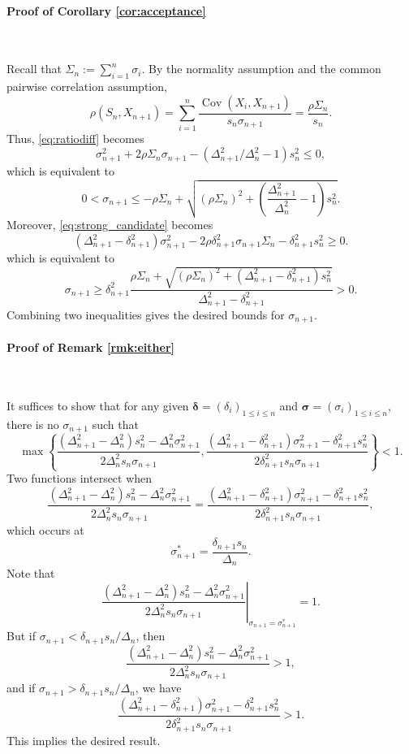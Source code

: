 \documentclass[fleqn,mnsc,nonblindrev]{informs4}
\newcommand{\Cov}{\operatorname{Cov}}
\begin{document}
\paragraph{Proof of Corollary \ref{cor:acceptance}}
\

Recall that $\Sigma_{n}:=\sum_{i=1}^n\sigma_{i}.$ By the normality assumption and the common pairwise correlation assumption,
\[
\rho(S_n,X_{n+1})=\sum_{i=1}^{n}\frac{\Cov(X_i,X_{n+1})}{s_{n}\sigma_{n+1}}=\frac{\rho\Sigma_{n}}{s_{n}}.
\]
Thus, \eqref{eq:ratiodiff} becomes
\[\sigma_{n+1}^2+2\rho\Sigma_{n}\sigma_{n+1}-(\Delta_{n+1}^2/\Delta_{n}^2-1)s_{n}^2\leq 0,
\]
which is equivalent to
\[
0<\sigma_{n+1}\leq  -\rho\Sigma_{n}+\sqrt{\left(\rho\Sigma_{n}\right)^2+\left(\frac{\Delta_{n+1}^2}{\Delta_{n}^2}-1\right)s_{n}^2}.
\]
Moreover, \eqref{eq:strong_candidate} becomes
\[
(\Delta_{n+1}^2-\delta_{n+1}^2)\sigma_{n+1}^2-2\rho\delta_{n+1}^2\sigma_{n+1}\Sigma_{n}-\delta_{n+1}^2s_{n}^2\geq0.
\]
which is equivalent to 
\[
\sigma_{n+1}\geq \delta_{n+1}^2\frac{\rho\Sigma_{n}+\sqrt{\left(\rho\Sigma_{n}\right)^2+(\Delta_{n+1}^2-\delta_{n+1}^2)s_{n}^2}}{\Delta_{n+1}^2-\delta_{n+1}^2}>0.
\]
Combining two inequalities gives the desired bounds for $\sigma_{n+1}.$
\bigskip

\paragraph{Proof of Remark \ref{rmk:either}}
\

It suffices to show that for any given $\boldsymbol{\delta}=(\delta_i)_{1\leq i\leq n}$ and $\boldsymbol{\sigma}=(\sigma_i)_{1\leq i\leq n},$ there is no $\sigma_{n+1}$ such that 
\[
\max\left\{ \frac{(\Delta_{n+1}^2-\Delta_n^2)s_{n}^2-\Delta_n^2\sigma_{n+1}^2}{2\Delta_n^2s_{n}\sigma_{n+1}},\frac{(\Delta_{n+1}^2-\delta_{n+1}^2)\sigma_{n+1}^2-\delta_{n+1}^2s_{n}^2}{2\delta_{n+1}^2s_n\sigma_{n+1}}\right\}
<1.
\]
Two functions intersect when
\[
\frac{(\Delta_{n+1}^2-\Delta_n^2)s_{n}^2-\Delta_n^2\sigma_{n+1}^2}{2\Delta_n^2s_{n}\sigma_{n+1}}=\frac{(\Delta_{n+1}^2-\delta_{n+1}^2)\sigma_{n+1}^2-\delta_{n+1}^2s_{n}^2}{2\delta_{n+1}^2s_n\sigma_{n+1}},
\]
which occurs at 
\[
\sigma_{n+1}^*=\frac{\delta_{n+1}s_n}{\Delta_n}.
\] 
Note that
\[
\left.\frac{(\Delta_{n+1}^2-\Delta_n^2)s_{n}^2-\Delta_n^2\sigma_{n+1}^2}{2\Delta_n^2s_{n}\sigma_{n+1}}\right|_{\sigma_{n+1}=\sigma_{n+1}^*}=1.
\]
But if $\sigma_{n+1}<\delta_{n+1}s_n/\Delta_n$, then 
\[
\frac{(\Delta_{n+1}^2-\Delta_n^2)s_{n}^2-\Delta_n^2\sigma_{n+1}^2}{2\Delta_n^2s_{n}\sigma_{n+1}}>1,
\]
and if $\sigma_{n+1}>\delta_{n+1}s_n/\Delta_n$, we have 
\[
\frac{(\Delta_{n+1}^2-\delta_{n+1}^2)\sigma_{n+1}^2-\delta_{n+1}^2s_{n}^2}{2\delta_{n+1}^2s_n\sigma_{n+1}}>1.
\]
This implies the desired result.
\bigskip 
\end{document}
